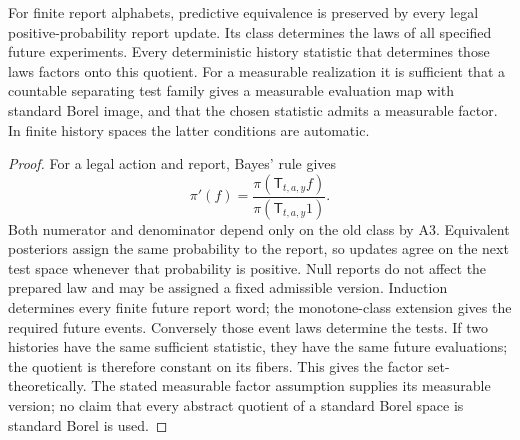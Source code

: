 \begin{theorem}
\label{thm:predictive-quotient}
For finite report alphabets, predictive equivalence is preserved by every
legal positive-probability report update. Its class determines the laws
of all specified future experiments. Every deterministic history
statistic that determines those laws factors onto this quotient.
For a measurable realization it is sufficient that a countable
separating test family gives a measurable evaluation map with standard
Borel image, and that the chosen statistic admits a measurable factor.
In finite history spaces the latter conditions are automatic.
\end{theorem}
\begin{proof}
For a legal action and report, Bayes' rule gives
\[
 \pi'(f)=\frac{\pi(\mathsf T_{t,a,y}f)}
                    {\pi(\mathsf T_{t,a,y}1)}.
\]
Both numerator and denominator depend only on the old class by A3.
Equivalent posteriors assign the same probability to the report, so
updates agree on the next test space whenever that probability is
positive. Null reports do not affect the prepared law and may be
assigned a fixed admissible version. Induction determines every finite
future report word; the monotone-class extension gives the required
future events. Conversely those event laws determine the tests.
If two histories have the same sufficient statistic, they have the
same future evaluations; the quotient is therefore constant on its
fibers. This gives the factor set-theoretically. The stated measurable
factor assumption supplies its measurable version; no claim that every
abstract quotient of a standard Borel space is standard Borel is used.
\end{proof}


